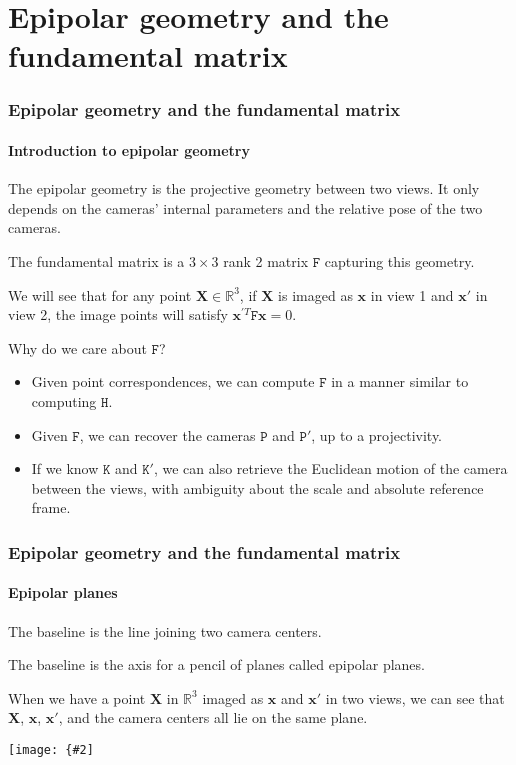 \documentclass[aspectratio=169]{beamer}
\renewcommand{\vec}[1]{\boldsymbol{#1}}
\newcommand{\mat}[1]{\mathtt{#1}}
\def\Rset{\mathbb{R}}
\newcommand{\myfig}[3]{\centerline{\texttt{[image: \{\#2]}}}
    \centerline{\scriptsize #3}}
\begin{document}
\section{Epipolar geometry and the fundamental matrix}

\begin{frame}
\frametitle{Epipolar geometry and the fundamental matrix}
\framesubtitle{Introduction to epipolar geometry}

The \alert{epipolar geometry} is the projective geometry between two
views.  It only depends on the cameras' internal parameters and the
relative pose of the two cameras.

\medskip

The \alert{fundamental matrix} is a $3\times 3$ rank 2 matrix
$\mat{F}$ capturing this geometry.

\medskip

We will see that for any point $\vec{X}\in\Rset^3$, if $\vec{X}$ is
imaged as $\vec{x}$ in view 1 and $\vec{x}'$ in view 2, the image
points will satisfy $\vec{x}^{\prime T}\mat{F}\vec{x}=0$.

\medskip

Why do we care about $\mat{F}$?
\begin{itemize}
\item Given \alert{point correspondences}, we can compute $\mat{F}$ in
  a manner similar to computing $\mat{H}$.
\item Given $\mat{F}$, we can \alert{recover the cameras} $\mat{P}$
  and $\mat{P}'$, up to a projectivity.
\item If we know $\mat{K}$ and $\mat{K}'$, we can also retrieve the
  \alert{Euclidean motion} of the camera between the views, with
  ambiguity about the scale and absolute reference frame.
\end{itemize}

\end{frame}

\begin{frame}
\frametitle{Epipolar geometry and the fundamental matrix}
\framesubtitle{Epipolar planes}

The \alert{baseline} is the line joining two camera centers.

\medskip

The baseline is the axis for a pencil of planes called \alert{epipolar
planes}.

\medskip

When we have a point $\vec{X}$ in $\Rset^3$ imaged as $\vec{x}$ and
$\vec{x}'$ in two views, we can see that $\vec{X}$, $\vec{x}$,
$\vec{x}'$, and the camera centers \alert{all lie on the same plane}.

\medskip

\myfig{2in}{HZ-fig8-1a}{Hartley and Zisserman (2004), Fig.\ 9.1a}

\end{frame}
\end{document}
